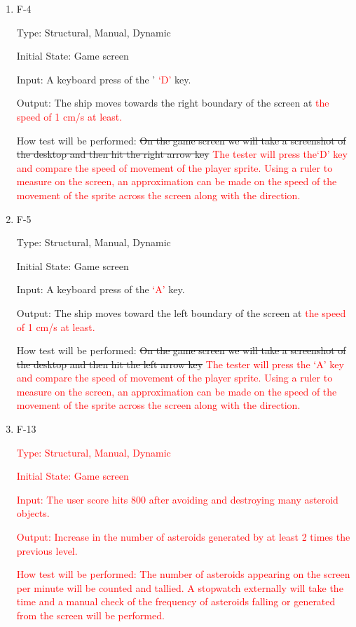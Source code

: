 \documentclass[12pt, titlepage]{article}
\begin{document}
\begin{enumerate}

\item{F-4\\}

Type: Structural, Manual, Dynamic

Initial State: Game screen 

Input: A keyboard press of the ' \textcolor{red}{`D'} key.

Output: The ship moves towards the right boundary of the screen at \textcolor{red}{the speed of 1 cm/s at least.}

How test will be performed: \sout{On the game screen we will take a screenshot of the desktop and then hit the right arrow key} \textcolor{red}{The tester will press the`D' key and compare the speed of movement of the player sprite. Using a ruler to measure on the screen, an approximation can be made on the speed of the movement of the sprite across the screen along with the direction.} 

\item{F-5\\}

Type: Structural, Manual, Dynamic

Initial State: Game screen

Input: A keyboard press of the \textcolor{red}{`A'} key.

Output: The ship moves toward the left boundary of the screen at \textcolor{red}{the speed of 1 cm/s at least.}

How test will be performed: \sout{On the game screen we will take a screenshot of the desktop and then hit the left arrow key} \textcolor{red}{The tester will press the `A' key and compare the speed of movement of the player sprite. Using a ruler to measure on the screen, an approximation can be made on the speed of the movement of the sprite across the screen along with the direction.} 

\item{F-13\\}

\textcolor{red}{Type:  Structural, Manual, Dynamic}

 \textcolor{red}{ Initial State: Game screen}

 \textcolor{red}{ Input: The user score hits 800 after avoiding and destroying many asteroid objects.}

 \textcolor{red}{Output: Increase in the number of asteroids generated by at least 2 times the previous level. }

\textcolor{red}{How test will be performed: The number of asteroids appearing on the screen per minute will be counted and tallied. A stopwatch externally will take the time and a manual check of the frequency of asteroids falling or generated from the screen will be performed.  }

\end{enumerate}
\end{document}

